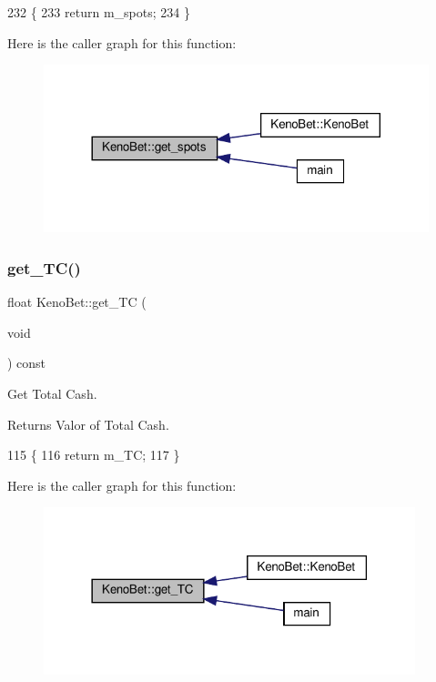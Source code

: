 \begin{DoxyCode}
232 \{
233     \textcolor{keywordflow}{return} m\_spots;
234 \}
\end{DoxyCode}
Here is the caller graph for this function\+:
\nopagebreak
\begin{figure}[H]
\begin{center}
\leavevmode
\includegraphics[width=317pt]{classKenoBet_a382454c66974466900d168c398699483_icgraph}
\end{center}
\end{figure}
\mbox{\label{classKenoBet_ade294f6dcb57c7a55be5ce2303664b0a}} 
\subsubsection{\texorpdfstring{get\+\_\+\+T\+C()}{get\_TC()}}
{\footnotesize\ttfamily float Keno\+Bet\+::get\+\_\+\+TC (\begin{DoxyParamCaption}\item[{void}]{ }\end{DoxyParamCaption}) const}



Get Total Cash. 

\begin{DoxyReturn}{Returns}
Valor of Total Cash. 
\end{DoxyReturn}

\begin{DoxyCode}
115 \{
116     \textcolor{keywordflow}{return} m\_TC;
117 \}
\end{DoxyCode}
Here is the caller graph for this function\+:
\nopagebreak
\begin{figure}[H]
\begin{center}
\leavevmode
\includegraphics[width=306pt]{classKenoBet_ade294f6dcb57c7a55be5ce2303664b0a_icgraph}
\end{center}
\end{figure}
\mbox{\label{classKenoBet_a15782d60d2e9b76f359963865a714a04}} 

